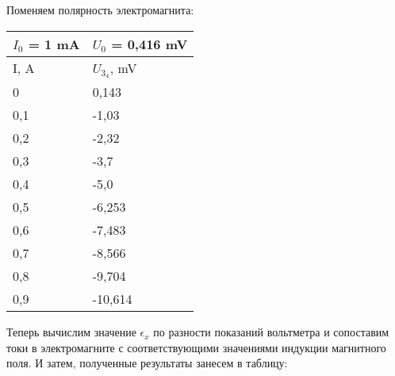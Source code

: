 \documentclass[a4paper, 12pt]{article}
\begin{document}
Поменяем полярность электромагнита:
\begin{center}
\begin{tabular}{|l|l|}
\hline
$I_0$ = 1 mA & $U_0$ = 0,416 mV \\ \hline
I, A         & $U_3_4$, mV      \\ \hline
0            & 0,143            \\ \hline
0,1          & -1,03            \\ \hline
0,2          & -2,32            \\ \hline
0,3          & -3,7             \\ \hline
0,4          & -5,0             \\ \hline
0,5          & -6,253           \\ \hline
0,6          & -7,483           \\ \hline
0,7          & -8,566           \\ \hline
0,8          & -9,704           \\ \hline
0,9          & -10,614          \\ \hline
\end{tabular}
\end{center}
Теперь вычислим значение $\epsilon_x$ по разности показаний вольтметра и сопоставим токи в электромагните с соответствующими значениями индукции магнитного поля. И затем, полученные результаты занесем в таблицу: \\
\end{document}
